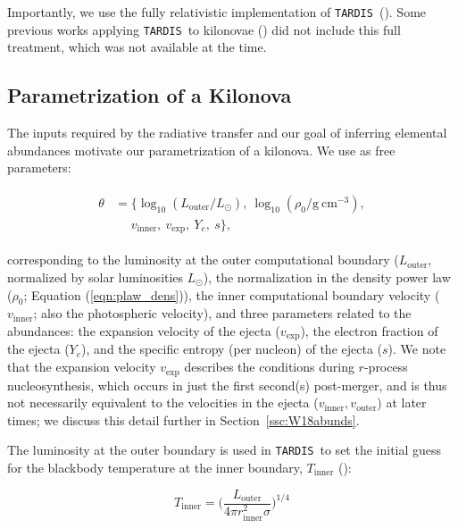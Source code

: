 \documentclass[twocolumn, twocolappendix]{aastex63}
\def\TARDIS{\texttt{TARDIS}}
\begin{document}
Importantly, we use the fully relativistic implementation of \TARDIS~(\citealt{vogl19, vogl20}). Some previous works applying \TARDIS~to kilonovae (\citealt{smartt17, watson19}) did not include this full treatment, which was not available at the time. 



\subsection{Parametrization of a Kilonova}\label{ssc:params}

The inputs required by the radiative transfer and our goal of inferring elemental abundances motivate our parametrization of a kilonova. We use as free parameters:

\begin{align}\label{eqn:params_inference}
\begin{split}
   \theta&=\{\log_{10}(L_{\mathrm{outer}}/L_{\odot}),~\log_{10}(\rho_0/\mathrm{g~cm^{-3}}),\\
   &~~~~~~v_{\mathrm{inner}},~v_{\mathrm{exp}},~Y_e,~s\}, 
\end{split}
\end{align}

\noindent corresponding to the luminosity at the outer computational boundary ($L_{\mathrm{outer}}$, normalized by solar luminosities $L_{\odot}$), the normalization in the density power law ($\rho_0$; Equation (\ref{eqn:plaw_dens})), the inner computational boundary velocity ($v_{\mathrm{inner}}$; also the photospheric velocity), and three parameters related to the abundances: the expansion velocity of the ejecta ($v_{\mathrm{exp}}$), the electron fraction of the ejecta ($Y_e$), and the specific entropy (per nucleon) of the ejecta ($s$). We note that the expansion velocity $v_{\mathrm{exp}}$ describes the conditions during $r$-process nucleosynthesis, which occurs in just the first second(s) post-merger, and is thus not necessarily equivalent to the velocities in the ejecta ($v_{\mathrm{inner}},v_{\mathrm{outer}}$) at later times; we discuss this detail further in Section~\ref{ssc:W18abunds}. 


The luminosity at the outer boundary is used in \TARDIS~to set the initial guess for the blackbody temperature at the inner boundary, $T_{\mathrm{inner}}$ (\citealt{kerzendorf14}):

\begin{equation}
    T_{\mathrm{inner}} = \Big( \frac{L_{\mathrm{outer}}}{4 \pi r_{\mathrm{inner}}^2 \sigma} \Big)^{1/4}
\end{equation}
\end{document}
